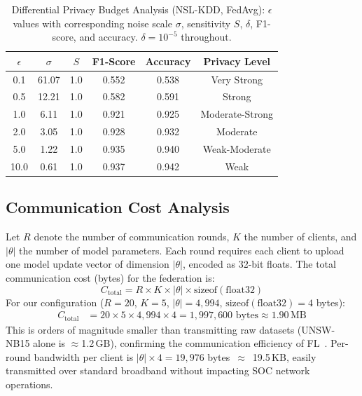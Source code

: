 \documentclass[conference]{IEEEtran}
\begin{document}
\begin{table}[htbp]
\centering
\caption{Differential Privacy Budget Analysis (NSL-KDD, FedAvg):
$\epsilon$ values with corresponding noise scale $\sigma$, sensitivity
$S$, $\delta$, F1-score, and accuracy. $\delta = 10^{-5}$ throughout.}
\label{tab:dp_budget}
\setlength{\tabcolsep}{4pt}
\begin{tabular}{cccccc}
\toprule
$\epsilon$ & $\sigma$ & $S$ & F1-Score & Accuracy & Privacy Level \\
\midrule
0.1  & 61.07 & 1.0 & 0.552 & 0.538 & Very Strong \\
0.5  & 12.21 & 1.0 & 0.582 & 0.591 & Strong \\
1.0  &  6.11 & 1.0 & 0.921 & 0.925 & Moderate-Strong \\
2.0  &  3.05 & 1.0 & 0.928 & 0.932 & Moderate \\
5.0  &  1.22 & 1.0 & 0.935 & 0.940 & Weak-Moderate \\
10.0 &  0.61 & 1.0 & 0.937 & 0.942 & Weak \\
\bottomrule
\end{tabular}
\end{table}

\subsection{Communication Cost Analysis}

Let $R$ denote the number of communication rounds, $K$ the number of
clients, and $|\theta|$ the number of model parameters.
Each round requires each client to upload one model update vector
of dimension $|\theta|$, encoded as 32-bit floats.
The total communication cost (bytes) for the federation is:
\begin{equation}
C_{\text{total}} = R \times K \times |\theta| \times
  \text{sizeof}(\text{float32})
\label{eq:comm_cost}
\end{equation}
For our configuration ($R=20$, $K=5$, $|\theta|=4{,}994$,
$\text{sizeof}(\text{float32})=4$ bytes):
\begin{align}
C_{\text{total}} &= 20 \times 5 \times 4{,}994 \times 4
  = 1{,}997{,}600 \text{ bytes} \approx 1.90\,\text{MB}
\end{align}
This is orders of magnitude smaller than transmitting raw datasets
(UNSW-NB15 alone is $\approx$1.2\,GB), confirming the
communication efficiency of FL~\cite{mcmahan2017}.
Per-round bandwidth per client is $|\theta| \times 4 = 19{,}976$
bytes~$\approx$~19.5\,KB, easily transmitted over standard broadband
without impacting SOC network operations.
\end{document}
